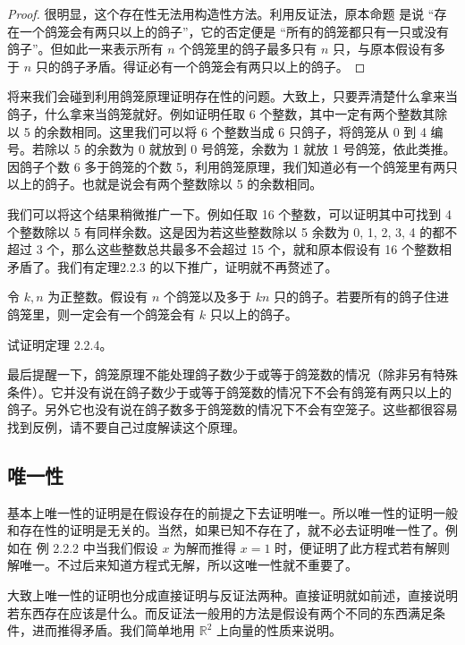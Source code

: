\begin{proof}
很明显，这个存在性无法用构造性方法。利用反证法，原本命题 是说 “存在一个鸽笼会有两只以上的鸽子”，它的否定便是 “所有的鸽笼都只有一只或没有鸽子”。但如此一来表示所有 $n$ 个鸽笼里的鸽子最多只有 $n$ 只，与原本假设有多于 $n$ 只的鸽子矛盾。得证必有一个鸽笼会有两只以上的鸽子。
\end{proof}

将来我们会碰到利用鸽笼原理证明存在性的问题。大致上，只要弄清楚什么拿来当鸽子，什么拿来当鸽笼就好。例如证明任取 6 个整数，其中一定有两个整数其除以 5 的余数相同。这里我们可以将 6 个整数当成 6 只鸽子，将鸽笼从 0 到 4 编号。若除以 5 的余数为 0 就放到 0 号鸽笼，余数为 1 就放 1 号鸽笼，依此类推。因鸽子个数 6 多于鸽笼的个数 5，利用鸽笼原理，我们知道必有一个鸽笼里有两只以上的鸽子。也就是说会有两个整数除以 5 的余数相同。

我们可以将这个结果稍微推广一下。例如任取 16 个整数，可以证明其中可找到 4 个整数除以 5 有同样余数。这是因为若这些整数除以 5 余数为 0, 1, 2, 3, 4 的都不超过 3 个，那么这些整数总共最多不会超过 15 个，就和原本假设有 16 个整数相矛盾了。我们有定理2.2.3 的以下推广，证明就不再赘述了。

\begin{theorem}
令 $k, n$ 为正整数。假设有 $n$ 个鸽笼以及多于 $kn$ 只的鸽子。若要所有的鸽子住进鸽笼里，则一定会有一个鸽笼会有 $k$ 只以上的鸽子。
\end{theorem}

\begin{question}
试证明定理 2.2.4。
\end{question}

最后提醒一下，鸽笼原理不能处理鸽子数少于或等于鸽笼数的情况（除非另有特殊条件）。它并没有说在鸽子数少于或等于鸽笼数的情况下不会有鸽笼有两只以上的鸽子。另外它也没有说在鸽子数多于鸽笼数的情况下不会有空笼子。这些都很容易找到反例，请不要自己过度解读这个原理。

\subsection{唯一性}

基本上唯一性的证明是在假设存在的前提之下去证明唯一。所以唯一性的证明一般和存在性的证明是无关的。当然，如果已知不存在了，就不必去证明唯一性了。例如在 例 2.2.2 中当我们假设 $x$ 为解而推得 $x = 1$ 时，便证明了此方程式若有解则解唯一。不过后来知道方程式无解，所以这唯一性就不重要了。

大致上唯一性的证明也分成直接证明与反证法两种。直接证明就如前述，直接说明若东西存在应该是什么。而反证法一般用的方法是假设有两个不同的东西满足条件，进而推得矛盾。我们简单地用 $\mathbb{R}^{2}$ 上向量的性质来说明。

